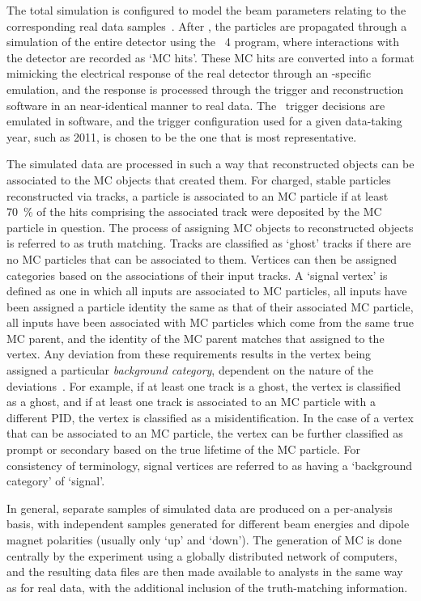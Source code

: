 The total simulation is configured to model the beam parameters relating to the 
corresponding real data samples~\cite{Belyaev:1322400}.
After \evtgen, the particles are propagated through a simulation of the entire 
detector using the \geant\ 4 program, where interactions with the detector are 
recorded as `\ac{MC} hits'.
These \ac{MC} hits are converted into a format mimicking the electrical 
response of the real detector through an \lhcb-specific emulation, and the 
response is processed through the trigger and reconstruction software in an 
near-identical manner to real data.
The \lzero\ trigger decisions are emulated in software, and the trigger 
configuration used for a given data-taking year, such as 2011, is chosen to be 
the one that is most representative.

The simulated data are processed in such a way that reconstructed objects can 
be associated to the \ac{MC} objects that created them.
For charged, stable particles reconstructed via tracks, a particle is 
associated to an \ac{MC} particle if at least \SI{70}{\percent} of the hits 
comprising the associated track were deposited by the \ac{MC} particle in 
question.
The process of assigning \ac{MC} objects to reconstructed objects is referred 
to as truth matching.
Tracks are classified as `ghost' tracks if there are no \ac{MC} particles that 
can be associated to them.
Vertices can then be assigned categories based on the associations of their 
input tracks.
A `signal vertex' is defined as one in which all inputs are associated to 
\ac{MC} particles, all inputs have been assigned a particle identity the same 
as that of their associated \ac{MC} particle, all inputs have been associated 
with \ac{MC} particles which come from the same true \ac{MC} parent, and the 
identity of the \ac{MC} parent matches that assigned to the vertex.
Any deviation from these requirements results in the vertex being assigned a 
particular \emph{background category}, dependent on the nature of the 
deviations~\cite{Gligorov:1035682}.
For example, if at least one track is a ghost, the vertex is classified as a 
ghost, and if at least one track is associated to an \ac{MC} particle with a 
different \ac{PID}, the vertex is classified as a misidentification.
In the case of a vertex that can be associated to an \ac{MC} particle, the 
vertex can be further classified as prompt or secondary based on the true 
lifetime of the \ac{MC} particle.
For consistency of terminology, signal vertices are referred to as having a 
`background category' of `signal'.

In general, separate samples of simulated data are produced on a per-analysis 
basis, with independent samples generated for different beam energies and 
dipole magnet polarities (usually only `up' and `down').
The generation of \ac{MC} is done centrally by the experiment using a globally 
distributed network of computers, and the resulting data files are then made 
available to analysts in the same way as for real data, with the additional 
inclusion of the truth-matching information.
